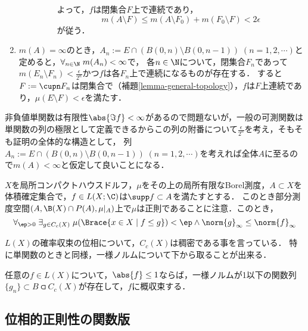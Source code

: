 \documentclass[uplatex, dvipdfmx]{jsreport}
\begin{document}
\begin{Proof}
\begin{enumerate}
\begin{description}
\begin{enumerate}[(a)]
                よって，$f$は閉集合$F$上で連続であり，
                \[m(A\setminus F)\le m(A\setminus F_0)+m(F_0\setminus F)<2\epsilon\]
                が従う．
            \end{enumerate}
        \end{description}
        \item $m(A)=\infty$のとき，$A_n:=E\cap(B(0,n)\setminus B(0,n-1))\;(n=1,2,\cdots)$と定めると，$\forall_{n\in\N}\;m(A_n)<\infty$で，
        各$n\in\N$について，閉集合$F_n$であって$m(E_n\setminus F_n)<\frac{\epsilon}{2^n}$かつ$f$は各$F_n$上で連続になるものが存在する．
        すると$F:=\cupn F_n$は閉集合で（補題\ref{lemma-general-topology}），$f$は$F$上連続であり，$\mu(E\setminus F)<\epsilon$を満たす．
    \end{enumerate}
\end{Proof}
\begin{remarks}[測度論の議論の仕方の特徴がよく出ている]
    非負値単関数は有限性$\abs{\Im f}<\infty$があるので問題ないが，一般の可測関数は単関数の列の極限として定義できるからこの列の附番について$\frac{\epsilon}{2^n}$を考え，そもそも証明の全体的な構造として，
    列$A_n:=E\cap(B(0,n)\setminus B(0,n-1))\;(n=1,2,\cdots)$を考えれば全体$A$に至るので$m(A)<\infty$と仮定して良いことになる．
\end{remarks}

\begin{corollary}
    $X$を局所コンパクトハウスドルフ，$\mu$をその上の局所有限なBorel測度，$A\subset X$を体積確定集合で，$f\in L(X;\C)$は$\supp f\subset A$を満たすとする．
    このとき部分測度空間$(A,\B(X)\cap P(A),\mu|_A)$上で$\mu$は正則であることに注意．このとき，
    \[\forall_{\ep>0}\;\exists_{g\in C_c(X)}\;\mu(\Brace{x\in X\mid f\le g})<\ep\land\norm{g}_\infty\le\norm{f}_\infty\]
\end{corollary}

\begin{remarks}
    $L(X)$の確率収束の位相について，$C_c(X)$は稠密である事を言っている．
    特に単関数のときと同様，一様ノルムについて下から取ることが出来る．
\end{remarks}

\begin{corollary}
    任意の$f\in L(X)$について，$\abs{f}\le1$ならば，一様ノルムが1以下の関数列$\{g_n\}\subset B\csub C_c(X)$が存在して，$f$に概収束する．
\end{corollary}

\subsection{位相的正則性の関数版}
\end{document}
